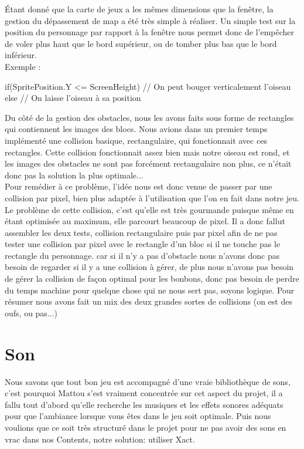 \documentclass [11pt]{report}
\begin{document}
		\indent Étant donné que la carte de jeux a les mêmes dimensions que la fenêtre, la gestion du dépassement de map a été très simple à réaliser. Un simple test sur la position du personnage par rapport à la fenêtre nous permet donc de l'empêcher de voler plus haut que le bord supérieur, ou de tomber plus bas que le bord inférieur. \\


	\newpage
		\noindent Exemple :
		
		\begin{mylisting}
		
if(SpritePosition.Y <= ScreenHeight)
{
	// On peut bouger verticalement l'oiseau
}
else
{
	// On laisse l'oiseau à sa position
}
		\end{mylisting}
	\vspace{10mm}
		
				
		\indent Du côté de la gestion des obstacles, nous les avons faits sous forme de rectangles qui contiennent les images des blocs. Nous avions dans un premier temps implémenté une collision basique, rectangulaire, qui fonctionnait avec ces rectangles. Cette collision fonctionnait assez bien mais notre oiseau est rond, et les images des obstacles ne sont pas forcément rectangulaire non plus, ce n'était donc pas la solution la plus optimale... \\
		\indent Pour remédier à ce problème, l'idée nous est donc venue de passer par une collision par pixel, bien plus adaptée à l'utilisation que l'on en fait dans notre jeu. Le problème de cette collision, c'est qu'elle est très gourmande puisque même en étant optimisée au maximum, elle parcourt beaucoup de pixel. Il a donc fallut assembler les deux tests, collision rectangulaire puis par pixel afin de ne pas tester une collision par pixel avec le rectangle d'un bloc si il ne touche pas le rectangle du personnage. car si il n'y a pas d'obstacle nous n'avons donc pas besoin de regarder si il y a une collision à gérer, de plus nous n'avons pas besoin de gérer la collision de façon optimal pour les bonbons, donc pas besoin de perdre du temps machine pour quelque chose qui ne nous sert pas, soyons logique. Pour résumer nous avons fait un mix des deux grandes sortes de collisions (on est des oufs, ou pas...)
		
		\newpage
	
	\section{Son}
		Nous savons que tout bon jeu est accompagné d'une vraie bibliothèque de sons, c'est pourquoi Mattou s'est vraiment concentrée sur cet aspect du projet, il a fallu tout d'abord qu'elle recherche les musiques et les effets sonores adéquats pour que l'ambiance lorsque vous êtes dans le jeu soit optimale. Puis nous voulions que ce soit très structuré dans le projet pour ne pas avoir des sons en vrac dans nos Contents, notre solution: utiliser Xact. \\
		
\end{document}
